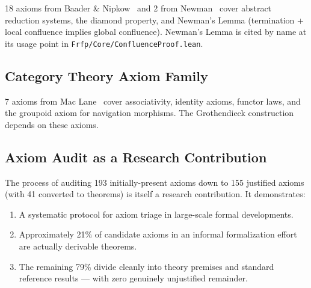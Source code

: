 18 axioms from Baader \& Nipkow~\cite{BaaderNipkow1998} and 2 from Newman~\cite{Newman1942} cover abstract
reduction systems, the diamond property, and Newman's Lemma (termination + local
confluence implies global confluence). Newman's Lemma is cited by name at its
usage point in \texttt{Frfp/Core/ConfluenceProof.lean}.

\subsection{Category Theory Axiom Family}

7 axioms from Mac Lane~\cite{MacLane1971} cover associativity, identity axioms, functor laws,
and the groupoid axiom for navigation morphisms. The Grothendieck construction
depends on these axioms.

\subsection{Axiom Audit as a Research Contribution}

The process of auditing 193 initially-present axioms down to 155 justified axioms
(with 41 converted to theorems) is itself a research contribution. It demonstrates:

\begin{enumerate}
  \item A systematic protocol for axiom triage in large-scale formal developments.
  \item Approximately 21\% of candidate axioms in an informal formalization
        effort are actually derivable theorems.
  \item The remaining 79\% divide cleanly into theory premises and standard
        reference results --- with zero genuinely unjustified remainder.
\end{enumerate}
